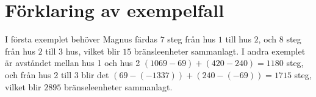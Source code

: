 \section*{Förklaring av exempelfall}
I första exemplet behöver Magnus färdas $7$ steg från hus $1$ till hus $2$, och $8$ steg från hus $2$ till $3$ hus, vilket blir $15$ bränsleenheter sammanlagt.
I andra exemplet är avståndet mellan hus 1 och hus 2 $(1069-69)+(420-240)=1180$ steg, och från hus 2 till 3 blir det $(69-(-1337))+(240-(-69))=1715$ steg, vilket blir $2895$ bränseleenheter sammanlagt.
